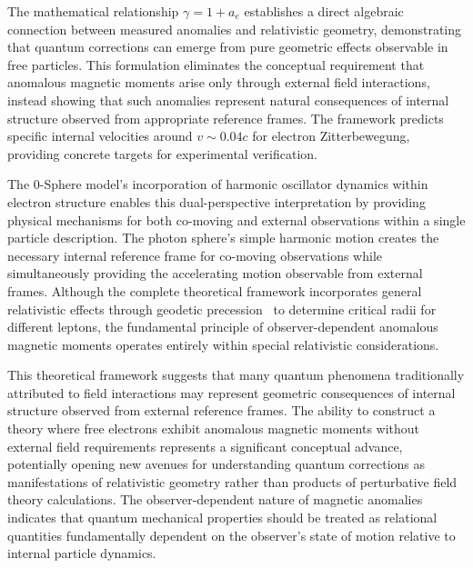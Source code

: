 \documentclass[%
 reprint,
 amsmath,amssymb,
 aps,
]{revtex4-1}
\numberwithin{equation}{section}%
\begin{document}
The mathematical relationship $\gamma = 1 + a_e$ establishes a direct algebraic connection between measured anomalies and relativistic geometry, demonstrating that quantum corrections can emerge from pure geometric effects observable in free particles. This formulation eliminates the conceptual requirement that anomalous magnetic moments arise only through external field interactions, instead showing that such anomalies represent natural consequences of internal structure observed from appropriate reference frames. The framework predicts specific internal velocities around $v \sim 0.04c$ for electron Zitterbewegung, providing concrete targets for experimental verification.

The 0-Sphere model's incorporation of harmonic oscillator dynamics within electron structure enables this dual-perspective interpretation by providing physical mechanisms for both co-moving and external observations within a single particle description. The photon sphere's simple harmonic motion creates the necessary internal reference frame for co-moving observations while simultaneously providing the accelerating motion observable from external frames. Although the complete theoretical framework incorporates general relativistic effects through geodetic precession~\cite{thomas1926,thomas1927} to determine critical radii for different leptons, the fundamental principle of observer-dependent anomalous magnetic moments operates entirely within special relativistic considerations.

This theoretical framework suggests that many quantum phenomena traditionally attributed to field interactions may represent geometric consequences of internal structure observed from external reference frames. The ability to construct a theory where free electrons exhibit anomalous magnetic moments without external field requirements represents a significant conceptual advance, potentially opening new avenues for understanding quantum corrections as manifestations of relativistic geometry rather than products of perturbative field theory calculations. The observer-dependent nature of magnetic anomalies indicates that quantum mechanical properties should be treated as relational quantities fundamentally dependent on the observer's state of motion relative to internal particle dynamics.
\end{document}
